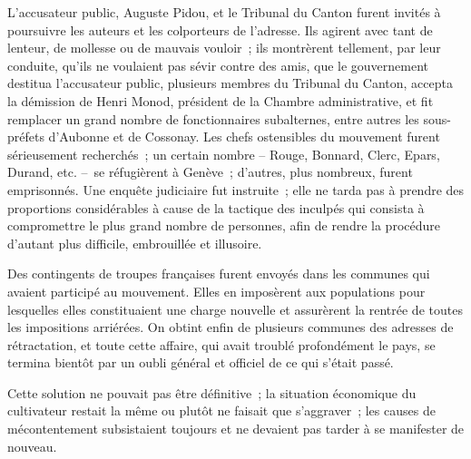 \documentclass[french,twoside]{book} %
\begin{document}
L’accusateur public, Auguste Pidou, et le Tribunal du Canton furent invités à poursuivre les auteurs et les colporteurs de l’adresse. Ils agirent avec tant de lenteur, de mollesse ou de mauvais vouloir ; ils montrèrent tellement, par leur conduite, qu’ils ne voulaient pas sévir contre des amis, que le gouvernement destitua l’accusateur public, plusieurs membres du Tribunal du Canton, accepta la démission de Henri Monod, président de la Chambre administrative, et fit remplacer un grand nombre de fonctionnaires subalternes, entre autres les sous-préfets d’Aubonne et de Cossonay. Les chefs ostensibles du mouvement furent sérieusement recherchés ; un certain nombre – Rouge, Bonnard, Clerc, Epars, Durand, etc. – se réfugièrent à Genève ; d’autres, plus nombreux, furent emprisonnés. Une enquête judiciaire fut instruite ; elle ne tarda pas à prendre des proportions considérables à cause de la tactique des inculpés qui consista à compromettre le plus grand nombre de personnes, afin de rendre la procédure d’autant plus difficile, embrouillée et illusoire.\par
Des contingents de troupes françaises furent envoyés dans les communes qui avaient participé au mouvement. Elles en imposèrent aux populations pour lesquelles elles constituaient une charge nouvelle et assurèrent la rentrée de toutes les impositions arriérées. On obtint enfin de plusieurs communes des adresses de rétractation, et toute cette affaire, qui avait troublé profondément le pays, se termina bientôt par un oubli général et officiel de ce qui s’était passé.\par
Cette solution ne pouvait pas être définitive ; la situation économique du cultivateur restait la même ou plutôt ne faisait que s’aggraver ; les causes de mécontentement subsistaient toujours et ne devaient pas tarder à se manifester de nouveau.
\end{document}

